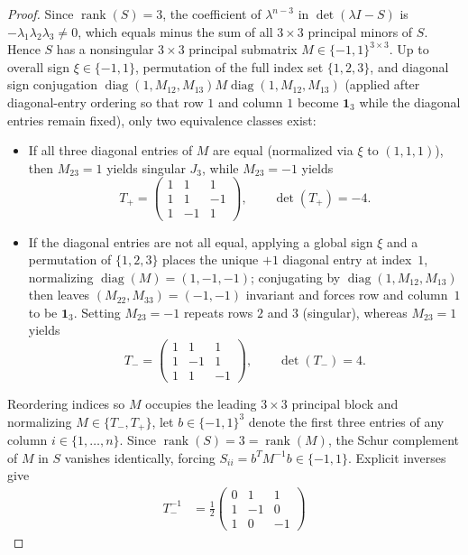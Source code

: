 \documentclass[11pt,reqno]{article}
\theoremstyle{definition}
\newcommand{\one}{\mathbf{1}}
\newcommand{\diag}{\operatorname{diag}}
\newcommand{\rank}{\operatorname{rank}}
\begin{document}
\begin{proof}
Since $\rank(S) = 3$, the coefficient of $\lambda^{n-3}$ in $\det(\lambda I - S)$ is $-\lambda_1 \lambda_2 \lambda_3 \ne 0$, which equals minus the sum of all $3 \times 3$ principal minors of $S$. Hence $S$ has a nonsingular $3 \times 3$ principal submatrix $M \in \{-1, 1\}^{3 \times 3}$. Up to overall sign $\xi \in \{-1, 1\}$, permutation of the full index set $\{1, 2, 3\}$, and diagonal sign conjugation $\diag(1, M_{12}, M_{13}) M \diag(1, M_{12}, M_{13})$ (applied after diagonal-entry ordering so that row $1$ and column $1$ become $\one_3$ while the diagonal entries remain fixed), only two equivalence classes exist:
\begin{itemize}
    \item If all three diagonal entries of $M$ are equal (normalized via $\xi$ to $(1, 1, 1)$), then $M_{23} = 1$ yields singular $J_3$, while $M_{23} = -1$ yields
    \[
    T_+ = \begin{pmatrix} 1 & 1 & 1 \\ 1 & 1 & -1 \\ 1 & -1 & 1 \end{pmatrix}, \qquad \det(T_+) = -4.
    \]
    \item If the diagonal entries are not all equal, applying a global sign $\xi$ and a permutation of $\{1, 2, 3\}$ places the unique $+1$ diagonal entry at index~$1$, normalizing $\diag(M) = (1, -1, -1)$; conjugating by $\diag(1, M_{12}, M_{13})$ then leaves $(M_{22}, M_{33}) = (-1, -1)$ invariant and forces row and column~$1$ to be $\one_3$. Setting $M_{23} = -1$ repeats rows $2$ and $3$ (singular), whereas $M_{23} = 1$ yields
    \[
    T_- = \begin{pmatrix} 1 & 1 & 1 \\ 1 & -1 & 1 \\ 1 & 1 & -1 \end{pmatrix}, \qquad \det(T_-) = 4.
    \]
\end{itemize}
Reordering indices so $M$ occupies the leading $3 \times 3$ principal block and normalizing $M \in \{T_-, T_+\}$, let $b \in \{-1, 1\}^3$ denote the first three entries of any column $i \in \{1, \dots, n\}$. Since $\rank(S) = 3 = \rank(M)$, the Schur complement of $M$ in $S$ vanishes identically, forcing $S_{ii} = b^T M^{-1} b \in \{-1, 1\}$. Explicit inverses give
\begin{align*}
T_-^{-1} &= \frac{1}{2}\begin{pmatrix} 0 & 1 & 1 \\ 1 & -1 & 0 \\ 1 & 0 & -1 \end{pmatrix}

\end{align*}
\end{proof}
\end{document}
